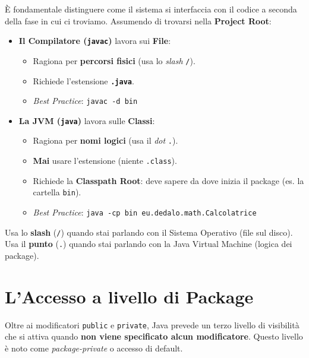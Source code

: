 \begin{warningbox}
È fondamentale distinguere come il sistema si interfaccia con il codice a seconda della fase in cui ci troviamo. Assumendo di trovarsi nella \textbf{Project Root}:

\begin{itemize}
    \item \textbf{Il Compilatore (\texttt{javac})} lavora sui \textbf{File}:
    \begin{itemize}
        \item Ragiona per \textbf{percorsi fisici} (usa lo \textit{slash} \texttt{/}).
        \item Richiede l'estensione \textbf{\texttt{.java}}.
        \item \textit{Best Practice}: \texttt{javac -d bin} 
    \end{itemize}
    
    \item \textbf{La JVM (\texttt{java})} lavora sulle \textbf{Classi}:
    \begin{itemize}
        \item Ragiona per \textbf{nomi logici} (usa il \textit{dot} \texttt{.}).
        \item \textbf{Mai} usare l'estensione (niente \texttt{.class}).
        \item Richiede la \textbf{Classpath Root}: deve sapere da dove inizia il package (es. la cartella \texttt{bin}).
        \item \textit{Best Practice}: \texttt{java -cp bin eu.dedalo.math.Calcolatrice}
    \end{itemize}
\end{itemize}
\end{warningbox}

\begin{tip}
    Usa lo \textbf{slash} (\texttt{/}) quando stai parlando con il Sistema Operativo (file sul disco). \\
    Usa il \textbf{punto} (\texttt{.}) quando stai parlando con la Java Virtual Machine (logica dei package).
\end{tip}

\section{L'Accesso a livello di Package}

Oltre ai modificatori \texttt{public} e \texttt{private}, Java prevede un terzo livello di visibilità che si attiva quando \textbf{non viene specificato alcun modificatore}. Questo livello è noto come \textit{package-private} o accesso di default.

